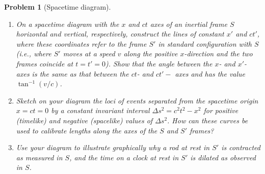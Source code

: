 \documentclass[a4paper]{article}
\theoremstyle{new2}
\theoremstyle{new}
\newtheorem{qns}{Problem}[section]
\begin{document}
\begin{qns}[Spacetime diagram]\leavevmode
\begin{enumerate}[label=(\alph*)]
\item On a spacetime diagram with the $x$ and $ct$ axes of an inertial frame $S$ horizontal and vertical, respectively, construct the lines of constant $x'$ and $ct'$, where these coordinates refer to the frame $S'$ in standard configuration with $S$ (i.e., where $S'$ moves at a speed $v$ along the positive $x$-direction and the two frames coincide at $t = t' = 0$). Show that the angle between the $x$- and $x'$- axes is the same as that between the $ct$- and $ct'-$ axes and has the value $\tan^{-1}(v/c)$.
\item Sketch on your diagram the loci of events separated from the spacetime origin $x = ct = 0$ by a constant invariant interval $\Delta s^2=c^2t^2-x^2$ for positive (timelike) and negative (spacelike) values of $\Delta s^2$. How can these curves be used to calibrate lengths along the axes of the $S$ and $S'$ frames?
\item Use your diagram to illustrate graphically why a rod at rest in $S'$ is \textit{contracted} as measured in $S$, and the time on a clock at rest in $S'$ is \textit{dilated} as observed in $S$.
\end{enumerate}
\end{qns}
\end{document}
